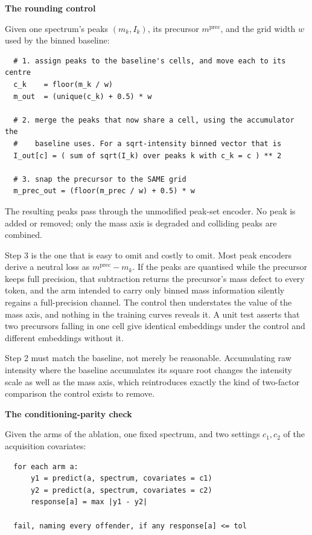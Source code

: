\documentclass[11pt]{article}
\newcommand{\hd}[1]{\medskip\par\noindent\textbf{#1}\par\nobreak\vspace{2pt}\noindent\ignorespaces}
\begin{document}
\hd{The rounding control}
Given one spectrum's peaks $(m_k, I_k)$, its precursor $m^{\mathrm{prec}}$, and the
grid width $w$ used by the binned baseline:

\begin{verbatim}
  # 1. assign peaks to the baseline's cells, and move each to its centre
  c_k    = floor(m_k / w)
  m_out  = (unique(c_k) + 0.5) * w

  # 2. merge the peaks that now share a cell, using the accumulator the
  #    baseline uses. For a sqrt-intensity binned vector that is
  I_out[c] = ( sum of sqrt(I_k) over peaks k with c_k = c ) ** 2

  # 3. snap the precursor to the SAME grid
  m_prec_out = (floor(m_prec / w) + 0.5) * w
\end{verbatim}

The resulting peaks pass through the unmodified peak-set encoder. No peak is added
or removed; only the mass axis is degraded and colliding peaks are combined.

Step 3 is the one that is easy to omit and costly to omit. Most peak encoders
derive a neutral loss as $m^{\mathrm{prec}} - m_k$. If the peaks are quantised
while the precursor keeps full precision, that subtraction returns the precursor's
mass defect to every token, and the arm intended to carry only binned mass
information silently regains a full-precision channel. The control then
understates the value of the mass axis, and nothing in the training curves
reveals it. A unit test asserts that two precursors falling in one cell give
identical embeddings under the control and different embeddings without it.

Step 2 must match the baseline, not merely be reasonable. Accumulating raw
intensity where the baseline accumulates its square root changes the intensity
scale as well as the mass axis, which reintroduces exactly the kind of two-factor
comparison the control exists to remove.

\hd{The conditioning-parity check}
Given the arms of the ablation, one fixed spectrum, and two settings $c_1, c_2$ of
the acquisition covariates:

\begin{verbatim}
  for each arm a:
      y1 = predict(a, spectrum, covariates = c1)
      y2 = predict(a, spectrum, covariates = c2)
      response[a] = max |y1 - y2|

  fail, naming every offender, if any response[a] <= tol
\end{verbatim}
\end{document}
